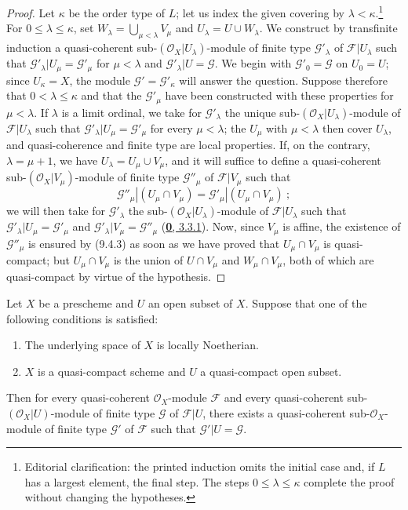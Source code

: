 \begin{proof}
Let $\kappa$ be the order type of $L$; let us index the given covering by $\lambda<\kappa$.\footnote{Editorial clarification: the printed induction omits the initial case and, if $L$ has a largest element, the final step. The steps $0\leq\lambda\leq\kappa$ complete the proof without changing the hypotheses.}
For $0\leq\lambda\leq\kappa$, set $W_\lambda=\bigcup_{\mu<\lambda}V_\mu$ and $U_\lambda=U\cup W_\lambda$.
We construct by transfinite induction a quasi-coherent sub-$(\mathscr{O}_X|U_\lambda)$-module of finite type $\mathscr{G}'_\lambda$ of $\mathscr{F}|U_\lambda$ such that $\mathscr{G}'_\lambda|U_\mu=\mathscr{G}'_\mu$ for $\mu<\lambda$ and $\mathscr{G}'_\lambda|U=\mathscr{G}$.
We begin with $\mathscr{G}'_0=\mathscr{G}$ on $U_0=U$; since $U_\kappa=X$, the module $\mathscr{G}'=\mathscr{G}'_\kappa$ will answer the question.
Suppose therefore that $0<\lambda\leq\kappa$ and that the $\mathscr{G}'_\mu$ have been constructed with these properties for $\mu<\lambda$.
If $\lambda$ is a limit ordinal, we take for $\mathscr{G}'_\lambda$ the unique sub-$(\mathscr{O}_X|U_\lambda)$-module of $\mathscr{F}|U_\lambda$ such that $\mathscr{G}'_\lambda|U_\mu=\mathscr{G}'_\mu$ for every $\mu<\lambda$; the $U_\mu$ with $\mu<\lambda$ then cover $U_\lambda$, and quasi-coherence and finite type are local properties.
If, on the contrary, $\lambda=\mu+1$, we have $U_\lambda=U_\mu\cup V_\mu$, and it will suffice to define a
quasi-coherent sub-$(\mathscr{O}_X|V_\mu)$-module of finite type
$\mathscr{G}''_\mu$ of $\mathscr{F}|V_\mu$ such that
\[
  \mathscr{G}''_\mu|(U_\mu\cap V_\mu)
  =\mathscr{G}'_\mu|(U_\mu\cap V_\mu)~;
\]
we will then take for $\mathscr{G}'_\lambda$ the
sub-$(\mathscr{O}_X|U_\lambda)$-module of $\mathscr{F}|U_\lambda$ such that
$\mathscr{G}'_\lambda|U_\mu=\mathscr{G}'_\mu$ and
$\mathscr{G}'_\lambda|V_\mu=\mathscr{G}''_\mu$
(\hyperref[0.3.3.1]{\textbf{0}, 3.3.1}). Now, since $V_\mu$ is affine, the
existence of $\mathscr{G}''_\mu$ is ensured by (9.4.3) as soon as we have
proved that $U_\mu\cap V_\mu$ is quasi-compact; but $U_\mu\cap V_\mu$ is the
union of $U\cap V_\mu$ and $W_\mu\cap V_\mu$, both of which are
quasi-compact by virtue of the hypothesis.
\end{proof}

\begin{theorem}[9.4.7]
\label{I.9.4.7}
Let $X$ be a prescheme and $U$ an open subset of $X$. Suppose that one of
the following conditions is satisfied:
\begin{enumerate}
  \item[\textup{a)}] The underlying space of $X$ is locally Noetherian.
  \item[\textup{b)}] $X$ is a quasi-compact scheme and $U$ a quasi-compact open
  subset.
\end{enumerate}
Then for every quasi-coherent $\mathscr{O}_X$-module $\mathscr{F}$ and every
quasi-coherent sub-$(\mathscr{O}_X|U)$-module \textup{of finite type} $\mathscr{G}$ of
$\mathscr{F}|U$, there exists a quasi-coherent sub-$\mathscr{O}_X$-module
\textup{of finite type} $\mathscr{G}'$ of $\mathscr{F}$ such that
$\mathscr{G}'|U=\mathscr{G}$.
\end{theorem}

